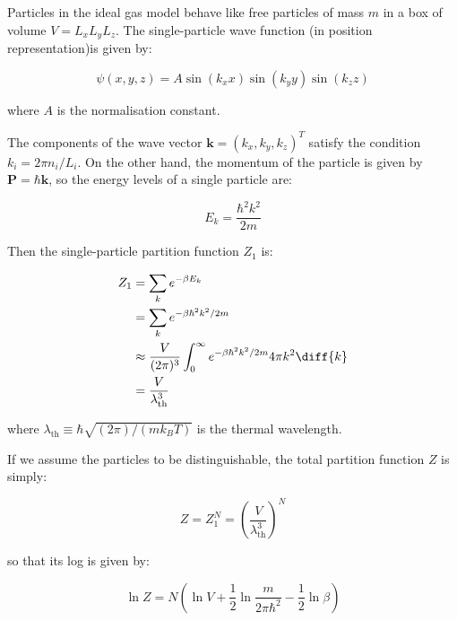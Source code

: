 \documentclass[12pt]{article}
\begin{document}

Particles in the ideal gas model behave like free particles of mass $m$ in a box of volume $V = L_{x}L_{y}L_{z}$. The single-particle wave function (in position representation)is given by:

\begin{equation}
    \psi(x, y, z) = A \sin{(k_{x}x)} \sin{(k_{y}y)} \sin{(k_{z}z)}
\end{equation}

where $A$ is the normalisation constant.

The components of the wave vector $\mathbf{k} = (k_{x}, k_{y}, k_{z})^{T}$ satisfy the condition $k_{i} = 2\pi n_{i}/L_{i}$. On the other hand, the momentum of the particle is given by $\mathbf{P} = \hbar \mathbf{k}$, so the energy levels of a single particle are:

\begin{equation}
    E_{k} = \frac{\hbar^{2} k^{2}}{2m}
\end{equation}

Then the single-particle partition function $Z_{1}$ is:

\begin{equation}
    \begin{split}
        Z_{1} &= \sum_{k} e^{-\beta E_{k}} \\
        &= \sum_{k} e^{-\beta \hbar^{2} k^{2}/2m} \\
        &\approx \frac{V}{(2\pi)^{3}} \int_{0}^{\infty} e^{-\beta \hbar^{2} k^{2}/2m} 4\pi k^{2} \diff{k} \\
        &= \frac{V}{\lambda_{\text{th}}^3}
    \end{split}
\end{equation}

where $\lambda_{\text{th}} \equiv \hbar \sqrt{(2\pi)/(m k_{B} T)}$ is the thermal wavelength.

If we assume the particles to be distinguishable, the total partition function $Z$ is simply:

\begin{equation}
    Z = Z_{1}^{N} = \left( \frac{V}{\lambda_{\text{th}}^3} \right)^{N}
\end{equation}

so that its log is given by:

\begin{equation}
    \ln{Z} = N \left(\ln{V} + \frac{1}{2} \ln{\frac{m}{2\pi \hbar^{2}}} - \frac{1}{2} \ln{\beta}\right)
\end{equation}
\end{document}
